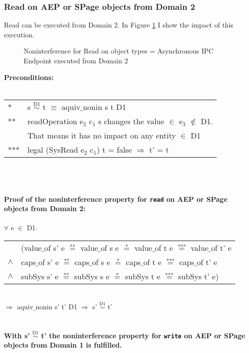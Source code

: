 \subsubsection{Read on AEP or SPage objects from Domain 2}
Read can be executed from Domain 2. In Figure \ref{fig:ReadOut2} I show the impact of this execution. 
\begin{flushleft}
\begin{figure}[H]
\caption{Noninterference for Read on object types = Asynchronous IPC Endpoint executed from Domain 2}
\label{fig:ReadOut2}
\end{figure}
\end{flushleft}
\textbf{Preconditions:} \\ \\
\begin{tabular}{ll}
* & s $\overset{\text{D1}}{\sim}$ t $\equiv$ aquiv$\_$nonin s t D1	\\ 
** & readOperation e$_2$ c$_1$ s changes the value $\in$ e$_3$ $\notin$ D1. \\
& That means it has no impact on any entity $\in$ D1 \\ 
*** & legal (SysRead e$_2$ c$_1$) t = false $\Rightarrow$ t' = t
\end{tabular} \\ \\ \\
\textbf{Proof of the noninterference property for \texttt{read} on AEP or SPage objects from Domain 2:}\\ \\
$\forall$ e $\in$ D1. \\
\begin{tabular}{ll}
& (value$\_$of s' e $\overset{\text{**}}{=}$ value$\_$of s e $\overset{\text{*}}{=}$ value$\_$of t e $\overset{\text{***}}{=}$ value$\_$of t' e \\
$\wedge$ & caps$\_$of s' e $\overset{\text{**}}{=}$ caps$\_$of s e $\overset{\text{*}}{=}$ caps$\_$of t e $\overset{\text{***}}{=}$ caps$\_$of t' e \\
$\wedge$ & subSys s' e $\overset{\text{**}}{=}$ subSys s e $\overset{\text{*}}{=}$ subSys t e $\overset{\text{***}}{=}$ subSys t' e)
\end{tabular} \\
$\Rightarrow$ aquiv$\_$nonin s' t' D1 $\Rightarrow$ s' $\overset{\text{D1}}{\sim}$ t' \\ \\ \\
\textbf{With s' $\overset{\text{D1}}{\sim}$ t' the noninterference property for \texttt{write} on AEP or SPage objects from Domain 1 is fulfilled.}  